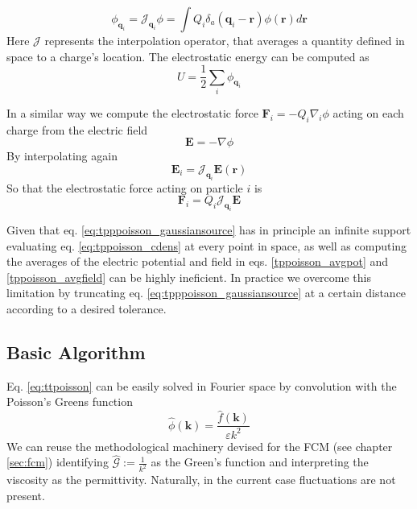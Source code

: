\documentclass[ twoside,openright,titlepage,numbers=noenddot,%
headinclude,footinclude,cleardoublepage=empty,abstract=on,
BCOR=5mm,paper=a4,fontsize=11pt, dvipsnames
]{scrreprt}
\renewcommand{\vec}[1]{\bm{#1}}
\newcommand{\oper}[1]{\mathcal{#1}}
\newcommand{\fou}[1]{\widehat{#1}}
\newcommand{\ppos}{q}
\newcommand{\fpos}{r}
\begin{document}
\begin{equation}  
  \phi_{\vec{\ppos}_i} = \oper{J}_{\vec{\ppos}_i}\phi = \int Q_i\delta_a(\vec{\ppos}_i - \vec{\fpos})\phi(\vec{\fpos})d\vec{\fpos}
\end{equation}
Here $\oper{J}$ represents the interpolation operator, that averages a quantity defined in space to a charge's location.
The electrostatic energy can be computed as
\begin{equation}
  \label{tppoisson_avgpot}
  U =  \frac{1}{2}\sum_i{\phi_{\vec{\ppos}_i}} 
\end{equation}

In a similar way we compute the electrostatic force $\vec{F}_i = -Q_i\nabla_i{\phi}$ acting on each charge from the electric field
\begin{equation}
  \label{eq:tppoisson_fieldnablaphi}
  \vec{E} = -\nabla{\phi}
\end{equation}
By interpolating again
\begin{equation}
  \label{tppoisson_avgfield}
\vec{E}_i = \oper{J}_{\vec{\ppos}_i}\vec{E}(\vec{\fpos})
\end{equation}
So that the electrostatic force acting on particle $i$ is
\begin{equation}
  \label{eq:tppoisson_force}
\vec{F}_i = Q_i\oper{J}_{\vec{\ppos}_i}\vec{E}
\end{equation}

Given that eq. \eqref{eq:tpppoisson_gaussiansource} has in principle an infinite support evaluating eq. \eqref{eq:tppoisson_cdens} at every point in space, as well as computing the averages of the electric potential and field in eqs. \eqref{tppoisson_avgpot} and \eqref{tppoisson_avgfield} can be highly ineficient. In practice we overcome this limitation by truncating eq. \eqref{eq:tpppoisson_gaussiansource} at a certain distance according to a desired tolerance.
\subsection*{Basic Algorithm}
Eq. \eqref{eq:ttpoisson} can be easily solved in Fourier space by convolution with the Poisson's Greens function 
\begin{equation}
  \label{tppoisson_phihat}
 \hat\phi(\vec{k}) = \frac{\hat f(\vec{k})}{\varepsilon k^2}
\end{equation}
We can reuse the methodological machinery devised for the \gls{FCM} (see chapter \ref{sec:fcm}) identifying $\fou{\oper{G}} := \frac{1}{k^2}$ as the Green's function and interpreting the viscosity as the permittivity. Naturally, in the current case fluctuations are not present.
\end{document}
